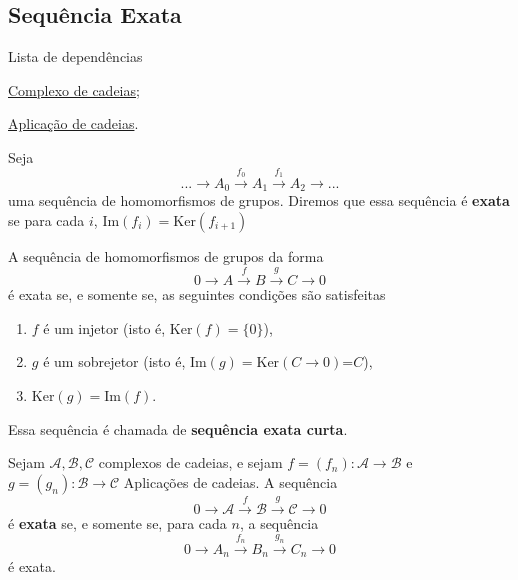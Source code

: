 \subsection{Sequência Exata} %
\label{sequencia-exata-def}
\begin{titlemize}{Lista de dependências}
	\item \hyperref[complexo-de-cadeias-def]{Complexo de cadeias};\\ 
    \item \hyperref[aplicacao-de-cadeias-def]{Aplicação de cadeias}.
\end{titlemize}

\begin{defi}
    Seja 
    \[...\rightarrow A_0\xrightarrow{f_0}A_1\xrightarrow{f_1} A_2\rightarrow ...\]
    uma sequência de homomorfismos de grupos. Diremos que essa sequência é \textbf{exata} se para cada $i$, $\text{Im}(f_i)=\text{Ker}(f_{i+1})$
\end{defi}

\begin{ex}
    A sequência de homomorfismos de grupos da forma 
    \[0\rightarrow A\xrightarrow{f}B\xrightarrow{g}C\rightarrow0\]
    é exata se, e somente se, as seguintes condições são satisfeitas
    \begin{enumerate}
        \item $f$ é um injetor (isto é, $\text{Ker}(f)=\{0\}$),
        \item $g$ é um sobrejetor (isto é, $\text{Im}(g)=\text{Ker}(C\rightarrow 0)$=$C$),
        \item $\text{Ker}(g)=\text{Im}(f)$. 
    \end{enumerate}
    Essa sequência é chamada de \textbf{sequência exata curta}.
\end{ex}

\begin{defi}
    Sejam $\mathcal{A},\mathcal{B},\mathcal{C}$ complexos de cadeias, e sejam $f= (f_n):\mathcal{A}\rightarrow \mathcal{B}$ e $g=(g_n):\mathcal{B}\rightarrow \mathcal{C}$ Aplicações de cadeias. A sequência 
    \[0\rightarrow \mathcal{A}\xrightarrow{f} \mathcal{B}\xrightarrow{g} \mathcal{C}\rightarrow 0\]
    é \textbf{exata} se, e somente se, para cada $n$, a sequência
    \[0\rightarrow A_n\xrightarrow{f_n} B_n\xrightarrow{g_n}C_n\rightarrow 0\]
    é exata.
\end{defi}

